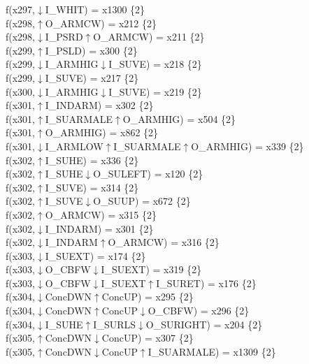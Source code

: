 f(x297,$\downarrow$I\_WHIT) = x1300 \{2\} \\  
f(x298,$\uparrow$O\_ARMCW) = x212 \{2\} \\  
f(x298,$\downarrow$I\_PSRD$\uparrow$O\_ARMCW) = x211 \{2\} \\  
f(x299,$\uparrow$I\_PSLD) = x300 \{2\} \\  
f(x299,$\downarrow$I\_ARMHIG$\downarrow$I\_SUVE) = x218 \{2\} \\  
f(x299,$\downarrow$I\_SUVE) = x217 \{2\} \\  
f(x300,$\downarrow$I\_ARMHIG$\downarrow$I\_SUVE) = x219 \{2\} \\  
f(x301,$\uparrow$I\_INDARM) = x302 \{2\} \\  
f(x301,$\uparrow$I\_SUARMALE$\uparrow$O\_ARMHIG) = x504 \{2\} \\  
f(x301,$\uparrow$O\_ARMHIG) = x862 \{2\} \\  
f(x301,$\downarrow$I\_ARMLOW$\uparrow$I\_SUARMALE$\uparrow$O\_ARMHIG) = x339 \{2\} \\  
f(x302,$\uparrow$I\_SUHE) = x336 \{2\} \\  
f(x302,$\uparrow$I\_SUHE$\downarrow$O\_SULEFT) = x120 \{2\} \\  
f(x302,$\uparrow$I\_SUVE) = x314 \{2\} \\  
f(x302,$\uparrow$I\_SUVE$\downarrow$O\_SUUP) = x672 \{2\} \\  
f(x302,$\uparrow$O\_ARMCW) = x315 \{2\} \\  
f(x302,$\downarrow$I\_INDARM) = x301 \{2\} \\  
f(x302,$\downarrow$I\_INDARM$\uparrow$O\_ARMCW) = x316 \{2\} \\  
f(x303,$\downarrow$I\_SUEXT) = x174 \{2\} \\  
f(x303,$\downarrow$O\_CBFW$\downarrow$I\_SUEXT) = x319 \{2\} \\  
f(x303,$\downarrow$O\_CBFW$\downarrow$I\_SUEXT$\uparrow$I\_SURET) = x176 \{2\} \\  
f(x304,$\downarrow$ConcDWN$\uparrow$ConcUP) = x295 \{2\} \\  
f(x304,$\downarrow$ConcDWN$\uparrow$ConcUP$\downarrow$O\_CBFW) = x296 \{2\} \\  
f(x304,$\downarrow$I\_SUHE$\uparrow$I\_SURLS$\downarrow$O\_SURIGHT) = x204 \{2\} \\  
f(x305,$\uparrow$ConcDWN$\downarrow$ConcUP) = x307 \{2\} \\  
f(x305,$\uparrow$ConcDWN$\downarrow$ConcUP$\uparrow$I\_SUARMALE) = x1309 \{2\} \\  
